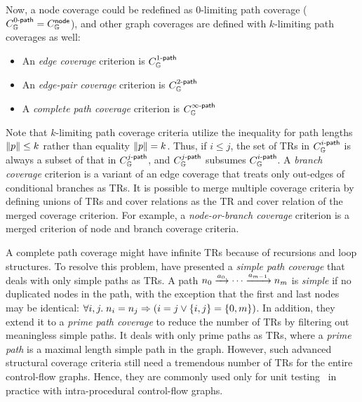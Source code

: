Now, a node coverage could be redefined as $0$-limiting path coverage
($C_{\mathbb{G}}^{{0}\textsf{-path}} = C_{\mathbb{G}}^{\textsf{node}}$), and other graph coverages are
defined with $k$-limiting path coverages as well:
\begin{itemize}
  \item An \textit{edge coverage} criterion is $C_{\mathbb{G}}^{{1}\textsf{-path}}$
  \item An \textit{edge-pair coverage} criterion is $C_{\mathbb{G}}^{{2}\textsf{-path}}$
  \item A \textit{complete path coverage} criterion is
    $C_{\mathbb{G}}^{{\infty}\textsf{-path}}$
\end{itemize}
%
Note that $k$-limiting path coverage criteria utilize the inequality for path
lengths $\lVert{p}\rVert \leq k$ rather than equality $\lVert{p}\rVert = k$.
%
Thus, if $i \leq j$, the set of TRs in $C_{\mathbb{G}}^{{i}\textsf{-path}}$ is always a subset
of that in $C_{\mathbb{G}}^{{j}\textsf{-path}}$, and $C_{\mathbb{G}}^{{j}\textsf{-path}}$ subsumes
$C_{\mathbb{G}}^{{i}\textsf{-path}}$.
%
A \textit{branch coverage} criterion is a variant of an edge coverage that
treats only out-edges of conditional branches as TRs.
%
It is possible to merge multiple coverage criteria by defining unions of TRs and
cover relations as the TR and cover relation of the merged coverage criterion.
%
For example, a \textit{node-or-branch coverage} criterion is a merged
criterion of node and branch coverage criteria.


A complete path coverage might have infinite TRs because of recursions and loop
structures.
%
To resolve this problem, \citet{testing} have presented a \textit{simple path
coverage} that deals with only simple paths as TRs.
%
A path $n_0 \xrightarrow{a_0} \cdots \xrightarrow{a_{m-1}} n_m$ is
\textit{simple} if no duplicated nodes in the path, with the exception that the
first and last nodes may be identical: $\forall i, j. \; n_i = n_j
\Rightarrow (i = j \vee \{ i, j \} = \{ 0, m \})$.
%
In addition, they extend it to a \textit{prime path coverage} to reduce the
number of TRs by filtering out meaningless simple paths.
%
It deals with only prime paths as TRs, where a \textit{prime path}
is a maximal length simple path in the graph.
%
However, such advanced structural coverage criteria still need a tremendous
number of TRs for the entire control-flow graphs.
%
Hence, they are commonly used only for unit testing~\cite{unit-test} in practice
with intra-procedural control-flow graphs.


